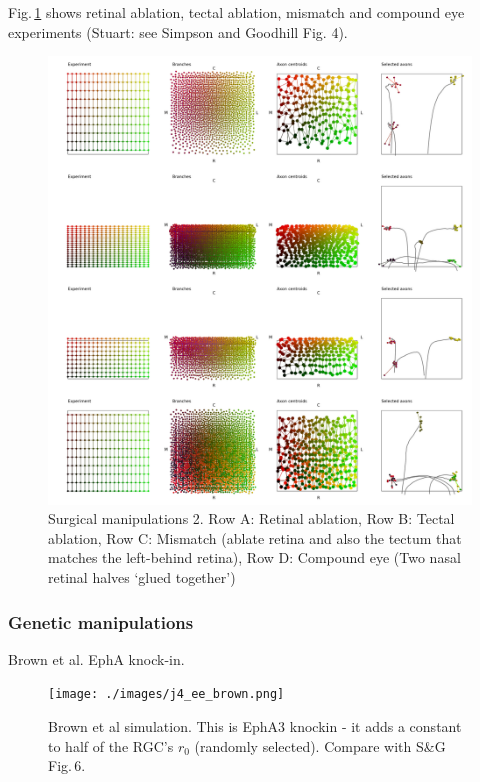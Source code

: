 \documentclass[11pt, a4paper]{article}
\begin{document}
Fig.\,\ref{f:surg2} shows retinal ablation, tectal ablation, mismatch and
compound eye experiments (Stuart: see Simpson and Goodhill Fig. 4).

\begin{figure}
\includegraphics[width=\linewidth]{./images/fig_manipulations2.png}
\caption{Surgical manipulations 2. Row A: Retinal ablation, Row B: Tectal
ablation, Row C: Mismatch (ablate retina and also the tectum that matches the
left-behind retina), Row D: Compound eye (Two nasal retinal halves `glued
together')}
\label{f:surg2}
\end{figure}

\subsubsection*{Genetic manipulations}

Brown et al. EphA knock-in.

\begin{figure}
\texttt{[image: ./images/j4\_ee\_brown.png]}
\caption{Brown et al simulation. This is EphA3 knockin - it adds a constant to
half of the RGC's $r_0$ (randomly selected). Compare with S\&G Fig.\,6.}
\label{f:brown}
\end{figure}
\end{document}
